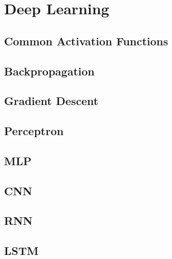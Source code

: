 \documentclass[18pt,a3paper,landscape, ncols=2]{cheatsheet}
\begin{document}
\newpage %

\section{Deep Learning} \seperator
	\subsection{Common Activation Functions}
		\begin{mdframed}
		\end{mdframed}
	\subsection{Backpropagation}
		\begin{mdframed}
		\end{mdframed}
	\subsection{Gradient Descent}
		\begin{mdframed}
		\end{mdframed}
	\subsection{Perceptron}
		\begin{mdframed}
		\end{mdframed}
	\subsection{MLP}
		\begin{mdframed}
		\end{mdframed}
	\subsection{CNN}
		\begin{mdframed}
		\end{mdframed}
	\subsection{RNN}
		\begin{mdframed}
		\end{mdframed}
	\subsection{LSTM}
		\begin{mdframed}
		\end{mdframed}
\end{document}

